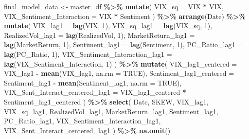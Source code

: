 \documentclass[
]{article}
\newenvironment{Shaded}{\begin{snugshade}}{\end{snugshade}}
\newcommand{\AttributeTok}[1]{\textcolor[rgb]{0.13,0.29,0.53}{#1}}
\newcommand{\ConstantTok}[1]{\textcolor[rgb]{0.56,0.35,0.01}{#1}}
\newcommand{\DecValTok}[1]{\textcolor[rgb]{0.00,0.00,0.81}{#1}}
\newcommand{\FunctionTok}[1]{\textcolor[rgb]{0.13,0.29,0.53}{\textbf{#1}}}
\newcommand{\NormalTok}[1]{#1}
\newcommand{\OtherTok}[1]{\textcolor[rgb]{0.56,0.35,0.01}{#1}}
\newcommand{\SpecialCharTok}[1]{\textcolor[rgb]{0.81,0.36,0.00}{\textbf{#1}}}
\begin{document}
\begin{Shaded}
\begin{Highlighting}[]
\NormalTok{  final\_model\_data }\OtherTok{\textless{}{-}}\NormalTok{ master\_df }\SpecialCharTok{\%\textgreater{}\%}
    \FunctionTok{mutate}\NormalTok{(}
      \AttributeTok{VIX\_sq =}\NormalTok{ VIX }\SpecialCharTok{*}\NormalTok{ VIX,}
      \AttributeTok{VIX\_Sentiment\_Interaction =}\NormalTok{ VIX }\SpecialCharTok{*}\NormalTok{ Sentiment }
\NormalTok{    ) }\SpecialCharTok{\%\textgreater{}\%}
    \FunctionTok{arrange}\NormalTok{(Date) }\SpecialCharTok{\%\textgreater{}\%}
    \FunctionTok{mutate}\NormalTok{(}
      \AttributeTok{VIX\_lag1 =} \FunctionTok{lag}\NormalTok{(VIX, }\DecValTok{1}\NormalTok{),}
      \AttributeTok{VIX\_sq\_lag1 =} \FunctionTok{lag}\NormalTok{(VIX\_sq, }\DecValTok{1}\NormalTok{),}
      \AttributeTok{RealizedVol\_lag1 =} \FunctionTok{lag}\NormalTok{(RealizedVol, }\DecValTok{1}\NormalTok{),}
      \AttributeTok{MarketReturn\_lag1 =} \FunctionTok{lag}\NormalTok{(MarketReturn, }\DecValTok{1}\NormalTok{),}
      \AttributeTok{Sentiment\_lag1 =} \FunctionTok{lag}\NormalTok{(Sentiment, }\DecValTok{1}\NormalTok{),}
      \AttributeTok{PC\_Ratio\_lag1 =} \FunctionTok{lag}\NormalTok{(PC\_Ratio, }\DecValTok{1}\NormalTok{),}
      \AttributeTok{VIX\_Sentiment\_Interaction\_lag1 =} \FunctionTok{lag}\NormalTok{(VIX\_Sentiment\_Interaction, }\DecValTok{1}\NormalTok{)}
\NormalTok{    ) }\SpecialCharTok{\%\textgreater{}\%}
    \FunctionTok{mutate}\NormalTok{(}
      \AttributeTok{VIX\_lag1\_centered =}\NormalTok{ VIX\_lag1 }\SpecialCharTok{{-}} \FunctionTok{mean}\NormalTok{(VIX\_lag1, }\AttributeTok{na.rm =} \ConstantTok{TRUE}\NormalTok{),}
      \AttributeTok{Sentiment\_lag1\_centered =}\NormalTok{ Sentiment\_lag1 }\SpecialCharTok{{-}} \FunctionTok{mean}\NormalTok{(Sentiment\_lag1, }\AttributeTok{na.rm =} \ConstantTok{TRUE}\NormalTok{),}
      \AttributeTok{VIX\_Sent\_Interact\_centered\_lag1 =}\NormalTok{ VIX\_lag1\_centered }\SpecialCharTok{*}\NormalTok{ Sentiment\_lag1\_centered}
\NormalTok{    ) }\SpecialCharTok{\%\textgreater{}\%}
    \FunctionTok{select}\NormalTok{(}
\NormalTok{      Date,}
\NormalTok{      SKEW,}
\NormalTok{      VIX\_lag1,}
\NormalTok{      VIX\_sq\_lag1,}
\NormalTok{      RealizedVol\_lag1,}
\NormalTok{      MarketReturn\_lag1,}
\NormalTok{      Sentiment\_lag1,}
\NormalTok{      PC\_Ratio\_lag1,}
\NormalTok{      VIX\_Sentiment\_Interaction\_lag1,}
\NormalTok{      VIX\_Sent\_Interact\_centered\_lag1 }
\NormalTok{    ) }\SpecialCharTok{\%\textgreater{}\%}
    \FunctionTok{na.omit}\NormalTok{() }
\end{Highlighting}
\end{Shaded}
\end{document}
